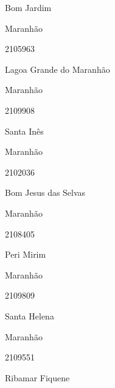 \documentclass[
  letterpaper,
]{report}
\begin{document}
Bom Jardim

\n    

\n    

\n      

Maranhão

\n      

2105963

\n      

Lagoa Grande do Maranhão

\n    

\n    

\n      

Maranhão

\n      

2109908

\n      

Santa Inês

\n    

\n    

\n      

Maranhão

\n      

2102036

\n      

Bom Jesus das Selvas

\n    

\n    

\n      

Maranhão

\n      

2108405

\n      

Peri Mirim

\n    

\n    

\n      

Maranhão

\n      

2109809

\n      

Santa Helena

\n    

\n    

\n      

Maranhão

\n      

2109551

\n      

Ribamar Fiquene

\n    

\n    

\n      
\end{document}
